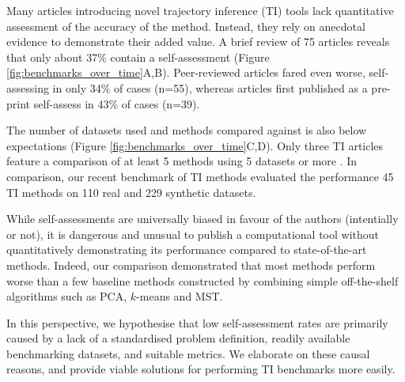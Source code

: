 
Many articles introducing novel trajectory inference (TI) tools lack quantitative assessment of the accuracy of the method. Instead, they rely on anecdotal evidence to demonstrate their added value. A brief review of 75 articles reveals that only about 37\% contain a self-assessment (Figure \ref{fig:benchmarks_over_time}A,B). Peer-reviewed articles fared even worse, self-assessing in only 34\% of cases (n=55), whereas articles first published as a pre-print self-assess in 43\% of cases (n=39).

The number of datasets used and methods compared against is also below expectations (Figure \ref{fig:benchmarks_over_time}C,D). Only three TI articles feature a comparison of at least 5 methods using 5 datasets or more \cite{sharma_forksfindingorderings_2017,guo_hoplandsinglecellpseudotime_2017,parra_reconstructingcomplexlineage_2018}. In comparison, our recent benchmark of TI methods evaluated the performance 45 TI methods on 110 real and 229 synthetic datasets\cite{saelens_comparisonsinglecelltrajectory_2019}.

While self-assessments are universally biased in favour of the authors\cite{norel_selfassessmenttrapcan_2011} (intentially or not), it is dangerous and unusual to publish a computational tool without quantitatively demonstrating its performance compared to state-of-the-art methods. Indeed, our comparison demonstrated that most methods perform worse than a few baseline methods constructed by combining simple off-the-shelf algorithms such as PCA, $k$-means and MST.

In this perspective, we hypothesise that low self-assessment rates are primarily caused by a lack of a standardised problem definition, readily available benchmarking datasets, and suitable metrics. 
We elaborate on these causal reasons, and provide viable solutions for performing TI benchmarks more easily.

